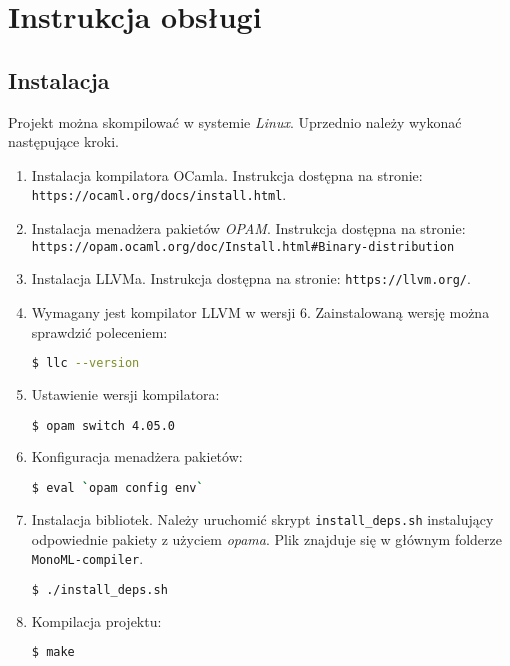 \documentclass[declaration,shortabstract]{iithesis}
\begin{document}

\chapter{Instrukcja obsługi}

\section{Instalacja}

Projekt można skompilować w systemie \textit{Linux}.
Uprzednio należy wykonać następujące kroki. 

\begin{enumerate}
  \item Instalacja kompilatora OCamla. Instrukcja dostępna na stronie: \newline
  \texttt{https://ocaml.org/docs/install.html}.
  \item Instalacja menadżera pakietów \textit{OPAM}. 
  Instrukcja dostępna na stronie: \newline
  \texttt{https://opam.ocaml.org/doc/Install.html\#Binary-distribution}
  \item Instalacja LLVMa. Instrukcja dostępna na stronie: \newline
  \texttt{https://llvm.org/}.
  \item Wymagany jest kompilator LLVM w wersji $6$. Zainstalowaną 
  wersję można sprawdzić poleceniem:
  \begin{lstlisting}[language=bash]
  $ llc --version
  \end{lstlisting}
  \item Ustawienie wersji kompilatora:
  \begin{lstlisting}[language=bash]
  $ opam switch 4.05.0
  \end{lstlisting}
  \item Konfiguracja menadżera pakietów:
  \begin{lstlisting}[language=bash]
  $ eval `opam config env`
  \end{lstlisting}
  \item Instalacja bibliotek. Należy uruchomić skrypt \texttt{install\_deps.sh}
   instalujący odpowiednie pakiety z użyciem \textit{opama}. Plik znajduje się 
   w głównym folderze 
  \texttt{MonoML-compiler}. 
  \begin{lstlisting}[language=bash]
  $ ./install_deps.sh
  \end{lstlisting}
  \item Kompilacja projektu:
  \begin{lstlisting}[language=bash]
  $ make 
  \end{lstlisting}
\end{enumerate}
\end{document}

